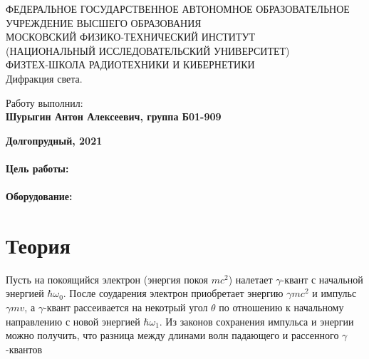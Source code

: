 \documentclass[15pt,a5paper,reqno]{article}
\begin{document}
\begin{center}
  {\small ФЕДЕРАЛЬНОЕ ГОСУДАРСТВЕННОЕ АВТОНОМНОЕ ОБРАЗОВАТЕЛЬНОЕ\\ УЧРЕЖДЕНИЕ ВЫСШЕГО ОБРАЗОВАНИЯ\\ МОСКОВСКИЙ ФИЗИКО-ТЕХНИЧЕСКИЙ ИНСТИТУТ\\ (НАЦИОНАЛЬНЫЙ ИССЛЕДОВАТЕЛЬСКИЙ УНИВЕРСИТЕТ)\\ ФИЗТЕХ-ШКОЛА РАДИОТЕХНИКИ И КИБЕРНЕТИКИ}\\
  \hfill \break
  \hfill \break
  \hfill \break
  \Huge{Дифракция света.}\\
\end{center}

\hfill \break
\hfill \break
\hfill \break
\hfill \break
\hfill \break
\hfill \break

\begin{flushright}
  \normalsize{Работу выполнил:}\\
  \normalsize{\textbf{Шурыгин Антон Алексеевич, группа Б01-909}}\\
\end{flushright}

\begin{center}
  \normalsize{\textbf{Долгопрудный, 2021}}
\end{center}


\thispagestyle{empty} %


\newpage
\thispagestyle{plain}
\tableofcontents
\thispagestyle{plain}
\newpage

\paragraph{Цель работы:}
\paragraph{Оборудование:}


\section{Теория}

Пусть на покоящийся электрон (энергия покоя $mc^2$) налетает $\gamma$-квант с начальной энергией $\hbar \omega_0$. После соударения электрон приобретает энергию $\gamma mc^2$ и импульс $\gamma mv$, а $\gamma$-квант рассеивается на некотрый угол $\theta$ по отношению к начальному направлению с новой энергией $\hbar \omega_1$. Из законов сохранения импульса и энергии можно получить, что разница между длинами волн падающего и рассенного $\gamma$-квантов
\end{document}
